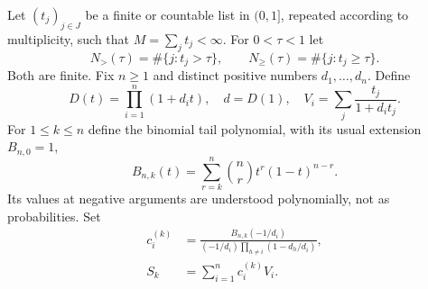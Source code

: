 \documentclass[11pt]{article}
\theoremstyle{remark}\newtheorem{remark}[theorem]{Remark}
\begin{document}
Let $(t_j)_{j\in J}$ be a finite or countable list in $(0,1]$, repeated according to multiplicity, such that $M=\sum_jt_j<\infty$. For $0<\tau<1$ let
\[
 N_>(\tau)=\#\{j:t_j>\tau\},\qquad N_\ge(\tau)=\#\{j:t_j\ge\tau\}.
\]
Both are finite. Fix $n\ge1$ and distinct positive numbers $d_1,\ldots,d_n$. Define
\[
 D(t)=\prod_{i=1}^n(1+d_it),\quad d=D(1),\quad
 V_i=\sum_j\frac{t_j}{1+d_i t_j}.
\]
For $1\le k\le n$ define the binomial tail polynomial, with its usual extension $B_{n,0}=1$,
\begin{equation}\label{eq:binom}
 B_{n,k}(t)=\sum_{r=k}^n \binom{n}{r}t^r(1-t)^{n-r}.
\end{equation}
Its values at negative arguments are understood polynomially, not as probabilities. Set
\begin{align}
 c_i^{(k)}&=\frac{B_{n,k}(-1/d_i)}{(-1/d_i)\prod_{h\ne i}(1-d_h/d_i)},\label{eq:coeff}\\
 S_k&=\sum_{i=1}^n c_i^{(k)}V_i.\label{eq:Sk}
\end{align}
\end{document}
